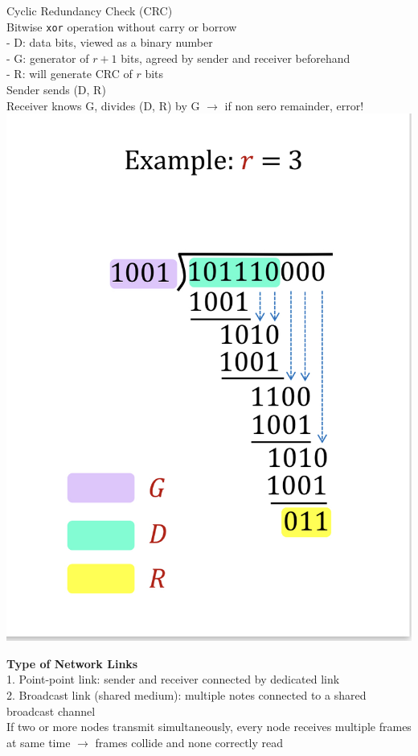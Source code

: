\documentclass[10pt, a4paper]{article}
\newcommand{\blue}[1]{{\color{MidnightBlue}#1}}
\newcommand{\red}[1]{{\color{red}#1}}
\begin{document}
\begin{multicols*}{3}
		Cyclic Redundancy Check (CRC)\\
		Bitwise \texttt{xor} operation without carry or borrow\\
		- \red{D}: data bits, viewed as a binary number\\
		- \red{G}: generator of $r + 1$ bits, agreed by sender and receiver beforehand\\
		- \red{R}: will generate CRC of $r$ bits\\
		Sender sends (D, R)\\
		Receiver knows G, divides (D, R) by G $\rightarrow$ if non sero remainder, \red{error!}\\
		\includegraphics[scale=.13]{./assets/crc}

		\textbf{Type of Network Links}\\
		1. Point-point link: sender and receiver connected by dedicated link\\
		2. Broadcast link (shared medium): multiple notes connected to a shared broadcast channel\\
		If two or more nodes transmit simultaneously, every node receives multiple frames at same time $\rightarrow$ frames \blue{collide} and none correctly read\\


\end{multicols*}
\end{document}
